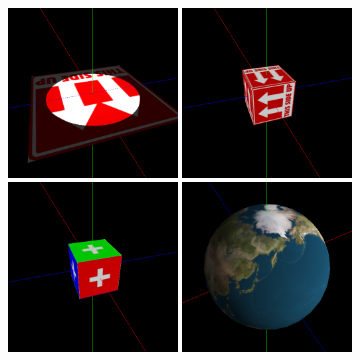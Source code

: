 \documentclass[12pt, a4paper]{article}
\begin{document}
\begin{figure}[H]
    \centering
    \includegraphics[width=0.4\textwidth]{res/phase4/results/Plane.png}
    \includegraphics[width=0.4\textwidth]{res/phase4/results/BoxSingleTexture.png}
    \includegraphics[width=0.4\textwidth]{res/phase4/results/BoxMultiTexture.png}
    \includegraphics[width=0.4\textwidth]{res/phase4/results/Sphere.png}
\end{figure}
\end{document}
